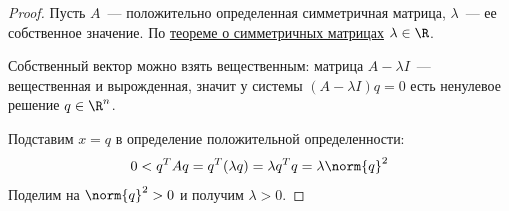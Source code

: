 

\begin{proof}
  Пусть $A$~--- положительно определенная симметричная матрица, $\lambda$~--- ее собственное значение. По \hyperref[note:4F4E5575-ABE6-4D9B-9C61-B76A3AA9701C]{теореме о симметричных матрицах} $\lambda \in \R$.

  Собственный вектор можно взять вещественным: матрица $A - \lambda I$~--- вещественная и вырожденная, значит у системы $(A - \lambda I) q = 0$ есть ненулевое решение $q \in \R^n$.

  Подставим $x = q$ в определение положительной определенности:
  \[
  0 < q^T A q = q^T (\lambda q) = \lambda q^T q = \lambda \norm{q}^2
  \]
  Поделим на $\norm{q}^2 > 0$ и получим $\lambda > 0$.
\end{proof}
